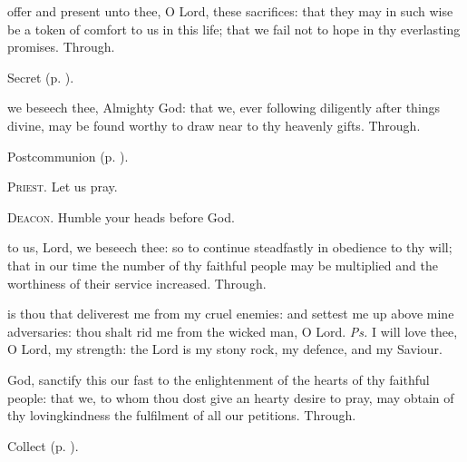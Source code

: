 
\secret
{} offer and present unto thee, O Lord, these sacrifices: that they may in such wise be a token of comfort to us in this life; that we fail not to hope in thy everlasting promises. Through.
\begin{rubric}
     Secret  (p. \pageref{AshWednesdayMassSecret}).
\end{rubric}


\postcommunion
{} we beseech thee, Almighty God: that we, ever following diligently after things divine, may be found worthy to draw near to thy heavenly gifts. Through.

\begin{rubric}
     Postcommunion  (p. \pageref{AshWednesdayMassPostcommunion}).
\end{rubric}

\textsc{Priest.} Let us pray.\par
\textsc{Deacon.} Humble your heads before God.\par
{} to us, Lord, we beseech thee: so to continue steadfastly in obedience to thy will; that in our time the number of thy faithful people may be multiplied and the worthiness of their service increased. Through.


\introit
{} is thou that deliverest me from my cruel enemies: and settest me up above mine adversaries: thou shalt rid me from the wicked man, O Lord. \textit{Ps.} I will love thee, O Lord, my strength: the Lord is my stony rock, my defence, and my Saviour.

\collect
{} God, sanctify this our fast to the enlightenment of the hearts of thy faithful people: that we, to whom thou dost give an hearty desire to pray, may obtain of thy lovingkindness the fulfilment of all our petitions. Through.
\begin{rubric}
     Collect  (p. \pageref{AshWednesdayMassCollect}).
\end{rubric}

